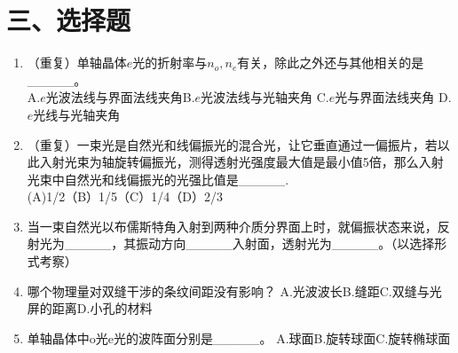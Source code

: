 \documentclass[12pt, a4paper]{article}
\theoremstyle{solution}
\begin{document}
\section*{三、选择题}
\begin{enumerate}
    \item （重复）单轴晶体$e$光的折射率与$n_o,n_e$有关，除此之外还与其他相关的是\_\_\_\_\_。\\
    A.$e$光波法线与界面法线夹角\quad B.$e$光波法线与光轴夹角 \quad C.$e$光与界面法线夹角 \quad D.$e$光线与光轴夹角
    \item （重复）一束光是自然光和线偏振光的混合光，让它垂直通过一偏振片，若以此入射光束为轴旋转偏振光，测得透射光强度最大值是最小值5倍，那么入射光束中自然光和线偏振光的光强比值是\_\_\_\_\_.\\(A)1/2\qquad（B）1/5\qquad（C）1/4\qquad（D）2/3
    \item 当一束自然光以布儒斯特角入射到两种介质分界面上时，就偏振状态来说，反射光为\_\_\_\_\_，其振动方向\_\_\_\_\_入射面，透射光为\_\_\_\_\_。（以选择形式考察）
    \item 哪个物理量对双缝干涉的条纹间距没有影响？
    A.光波波长\quad B.缝距\quad C.双缝与光屏的距离\quad D.小孔的材料\quad
    \item 单轴晶体中o光e光的波阵面分别是\_\_\_\_\_。
    A.球面\quad B.旋转球面\quad C.旋转椭球面
\end{enumerate}
\end{document}
